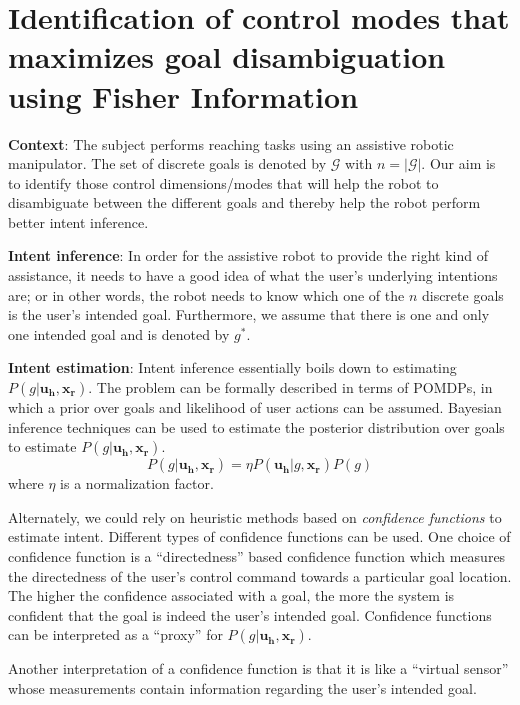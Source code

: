 \documentclass[]{article}
\begin{document}
\section*{Identification of control modes that maximizes goal disambiguation using Fisher Information}

\textbf{Context}: The subject performs reaching tasks using an assistive robotic manipulator. The set of discrete goals is denoted by $\mathcal{G}$ with $n = |\mathcal{G}|$. Our aim is to identify those control dimensions/modes that will help the robot to disambiguate between the different goals and thereby help the robot perform better intent inference. 

\noindent \textbf{Intent inference}: In order for the assistive robot to provide the right kind of assistance, it needs to have a good idea of what the user's underlying intentions are; or in other words, the robot needs to know which one of the $n$ discrete goals is the user's intended goal. Furthermore, we assume that there is one and only one intended goal and is denoted by $g^*$.

\noindent \textbf{Intent estimation}: Intent inference essentially boils down to estimating $P(g|\boldsymbol{u_h}, \boldsymbol{x_r})$. The problem can be formally described in terms of POMDPs, in which a prior over goals and likelihood of user actions can be assumed. Bayesian inference techniques can be used to estimate the posterior distribution over goals to estimate $P(g|\boldsymbol{u_h}, \boldsymbol{x_r})$. 
\begin{equation*}
 P(g|\boldsymbol{u_h}, \boldsymbol{x_r}) = \eta P(\boldsymbol{u_h} | g, \boldsymbol{x_r})P(g)
\end{equation*}
where $\eta$ is a normalization factor. 

Alternately, we could rely on heuristic methods based on \textit{confidence functions} to estimate intent. Different types of confidence functions can be used. One choice of confidence function is a ``directedness'' based confidence function which measures the directedness of the user's control command towards a particular goal location. The higher the confidence associated with a goal, the more the system is confident that the goal is indeed the user's intended goal. 
Confidence functions can be interpreted as a ``proxy'' for $P(g|\boldsymbol{u_h}, \boldsymbol{x_r})$. 

Another interpretation of a confidence function is that it is like a ``virtual sensor'' whose measurements contain information regarding the user's intended goal.
\end{document}
